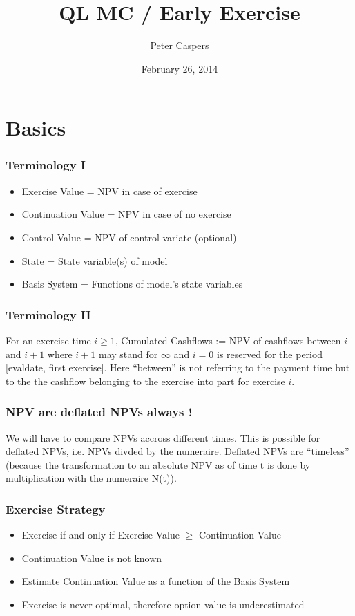 \documentclass{beamer}
\begin{document}
\title{QL MC / Early Exercise}  
\author{Peter Caspers}
\date{February 26, 2014} 

\frame{\titlepage} 


\section{Basics}

\begin{frame}
\frametitle{Terminology I}
\begin{itemize}
\item Exercise Value = NPV in case of exercise
\item Continuation Value = NPV in case of no exercise
\item Control Value = NPV of control variate (optional)
\item State = State variable(s) of model
\item Basis System = Functions of model's state variables
\end{itemize}
\end{frame}

\begin{frame}
\frametitle{Terminology II}
For an exercise time $i\geq 1$, Cumulated Cashflows := NPV of cashflows between $i$ and $i+1$
where $i+1$ may stand for $\infty$ and $i=0$ is reserved for the period
[evaldate, first exercise]. Here ``between'' is not referring to the payment
time but to the the cashflow belonging to the exercise into part for 
exercise $i$.
\end{frame}

\begin{frame}
\frametitle{NPV are deflated NPVs always !}
We will have to compare NPVs accross different times. This is possible
for deflated NPVs, i.e. NPVs divded by the numeraire. Deflated NPVs
are ``timeless'' (because the transformation to an absolute NPV as
of time t is done by multiplication with the numeraire N(t)).
\end{frame}

\begin{frame}
\frametitle{Exercise Strategy}
\begin{itemize}
\item Exercise if and only if Exercise Value $\geq$ Continuation Value
\item Continuation Value is not known
\item Estimate Continuation Value as a function of the Basis System
\item Exercise is never optimal, therefore option value is underestimated
\end{itemize}
\end{frame}
\end{document}
